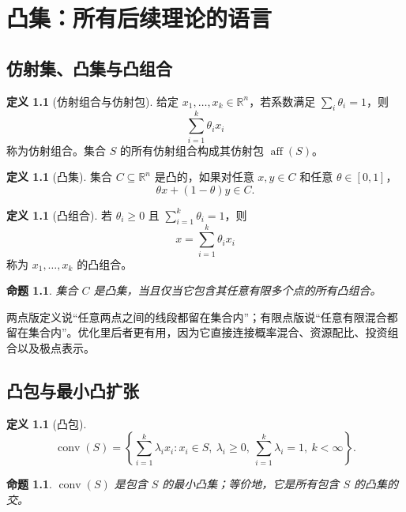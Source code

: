 \documentclass[11pt,a4paper,openany]{ctexrep}
\newtheorem{proposition}[theorem]{命题}
\theoremstyle{definition}
\newtheorem{definition}[theorem]{定义}
\newcommand{\R}{\mathbb{R}}
\newcommand{\aff}{\operatorname{aff}}
\newcommand{\conv}{\operatorname{conv}}
\begin{document}
\chapter{凸集：所有后续理论的语言}

\section{仿射集、凸集与凸组合}

\begin{definition}[仿射组合与仿射包]
给定 $x_1,\dots,x_k\in\R^n$，若系数满足 $\sum_i\theta_i=1$，则
\[
\sum_{i=1}^k\theta_i x_i
\]
称为仿射组合。集合 $S$ 的所有仿射组合构成其仿射包 $\aff(S)$。
\end{definition}

\begin{definition}[凸集]
集合 $C\subseteq\R^n$ 是凸的，如果对任意 $x,y\in C$ 和任意 $\theta\in[0,1]$，
\[
\theta x+(1-\theta)y\in C.
\]
\end{definition}

\begin{definition}[凸组合]
若 $\theta_i\ge0$ 且 $\sum_{i=1}^k\theta_i=1$，则
\[
x=\sum_{i=1}^k\theta_i x_i
\]
称为 $x_1,\dots,x_k$ 的凸组合。
\end{definition}

\begin{proposition}
集合 $C$ 是凸集，当且仅当它包含其任意有限多个点的所有凸组合。
\end{proposition}

\begin{intuitionbox}[几何直觉]
两点版定义说“任意两点之间的线段都留在集合内”；有限点版说“任意有限混合都留在集合内”。优化里后者更有用，因为它直接连接概率混合、资源配比、投资组合以及极点表示。
\end{intuitionbox}

\section{凸包与最小凸扩张}

\begin{definition}[凸包]
\[
\conv(S)=\left\{\sum_{i=1}^k\lambda_i x_i:
 x_i\in S,\ \lambda_i\ge0,\ \sum_{i=1}^k\lambda_i=1,\ k<\infty\right\}.
\]
\end{definition}

\begin{proposition}
$\conv(S)$ 是包含 $S$ 的最小凸集；等价地，它是所有包含 $S$ 的凸集的交。
\end{proposition}
\end{document}
